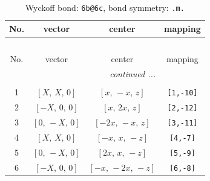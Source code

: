 \documentclass[fleqn,8pt]{jsarticle}
\begin{document}
\begin{longtable}{cccc}
\caption{Wyckoff bond: {\tt 6b@6c}, bond symmetry: {\tt .m.}}
 \\
 \hline \hline
No. & vector & center & mapping \\ \hline \endfirsthead

\multicolumn{3}{l}{\tablename\ \thetable{}} \\
 \hline \hline
No. & vector & center & mapping \\ \hline \endhead

 \hline \hline
\multicolumn{3}{r}{\footnotesize\it continued ...} \\ \endfoot

 \hline \hline
\multicolumn{3}{r}{} \\ \endlastfoot

1 & $\left[ X,\, X,\, 0 \right]$ & $\left[ x,\, - x,\, z \right]$ & {\tt [1,-10]} \\ \hline
2 & $\left[ - X,\, 0,\, 0 \right]$ & $\left[ x,\, 2 x,\, z \right]$ & {\tt [2,-12]} \\ \hline
3 & $\left[ 0,\, - X,\, 0 \right]$ & $\left[ - 2 x,\, - x,\, z \right]$ & {\tt [3,-11]} \\ \hline
4 & $\left[ X,\, X,\, 0 \right]$ & $\left[ - x,\, x,\, - z \right]$ & {\tt [4,-7]} \\ \hline
5 & $\left[ 0,\, - X,\, 0 \right]$ & $\left[ 2 x,\, x,\, - z \right]$ & {\tt [5,-9]} \\ \hline
6 & $\left[ - X,\, 0,\, 0 \right]$ & $\left[ - x,\, - 2 x,\, - z \right]$ & {\tt [6,-8]} \\
\end{longtable}
\renewcommand{\arraystretch}{1.2}
\end{document}
